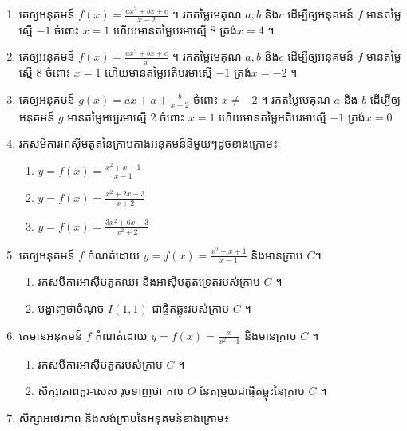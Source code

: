 \documentclass[12pt,a4paper]{article}
\begin{document}
\begin{enumerate}[m]
\begin{multicols}{3}
\begin{enumerate}[k]
		\item $y=\frac{x^2-x-2}{x+2}$
		\item $y=\frac{x^2-3x+6}{x-2}$
		\item $y=\frac{x^2+x+2}{x-1}$
		\end{enumerate}
	\end{multicols}
\item គេឲ្យអនុគមន៍ $f(x)=\frac{ax^2+bx+c}{x-2}$ ។ រកតម្លៃមេគុណ $a, b$ និង$c$ ដើម្បីឲ្យអនុគមន៍ $f$ មានតម្លៃស្មើ $-1$ ចំពោះ $x=1$ ហើយមានតម្លៃបរមាស្មើ $8$ ត្រង់$x=4$ ។
\item គេឲ្យអនុគមន៍ $f(x)=\frac{ax^2+bx+c}{x}$ ។ រកតម្លៃមេគុណ $a, b$ និង$c$ ដើម្បីឲ្យអនុគមន៍ $f$ មានតម្លៃស្មើ $8$ ចំពោះ $x=1$ ហើយមានតម្លៃអតិបរមាស្មើ $-1$ ត្រង់$x=-2$ ។
\item គេឲ្យអនុគមន៍ $g(x)=ax+a+\frac{b}{x+2}$ ចំពោះ $x\neq -2$ ។ រកតម្លៃមេគុណ $a$ និង $b$ ដើម្បីឲ្យអនុគមន៍ $g$ មានតម្លៃអប្បរមាស្មើ $2$ ចំពោះ $x=1$ ហើយមានតម្លៃអតិបរមាស្មើ $-1$ ត្រង់$x=0$ 
\item រកសមីការអាស៊ីមតូតនៃក្រាបតាងអនុគមន៍នីមួយៗដូចខាងក្រោម៖
	\begin{multicols}{3}
		\begin{enumerate}[k]
		\item $y=f(x)=\frac{x^2+x+1}{x-1}$
		\item $y=f(x)=\frac{x^2+2x-3}{x+2}$
		\item $y=f(x)=\frac{3x^2+6x+3}{x^2+2}$
		\end{enumerate}
	\end{multicols}
\item គេឲ្យអនុគមន៍ $f$ កំណត់ដោយ $y=f(x)=\frac{x^2-x+1}{x-1}$ និងមានក្រាប $C$។
\begin{enumerate}[k]
\item រកសមីការអាស៊ីមតូតឈរ និងអាស៊ីមតូតទ្រេតរបស់ក្រាប $C$ ។
\item បង្ហាញថាចំណុច $I(1, 1)$ ជាផ្ចិតឆ្លុះរបស់ក្រាប $C$ ។
\end{enumerate}
\item គេមានអនុគមន៍ $f$ កំណត់ដោយ $y=f(x)=\frac{x}{x^2+1}$ និងមានក្រាប $C$ ។
	\begin{enumerate}[k]
		\item រកសមីការអាស៊ីមតូតរបស់ក្រាប $C$ ។
		\item សិក្សាភាពគូរ-សេស រួចទាញថា គល់ $O$ នៃតម្រុយជាផ្ចិតឆ្លុះនៃក្រាប $C$ ។
	\end{enumerate}
\item សិក្សាអថេរភាព និងសង់ក្រាបនៃអនុគមន៍ខាងក្រោម៖ 
	\begin{multicols}{3}
		\begin{enumerate}[k]

\end{enumerate}
\end{multicols}
\end{enumerate}
\end{document}
